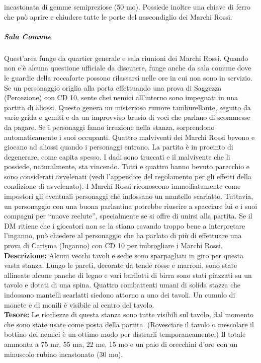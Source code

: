 \documentclass{article}
\begin{document}
        incastonata di gemme semipreziose (50 mo). Possiede inoltre
        una chiave di ferro che può aprire e chiudere tutte le porte del
        nascondiglio dei Marchi Rossi.
        \subparagraph{Sala Comune} 
        Quest'area funge da quartier generale e sala riunioni dei
        Marchi Rossi. Quando non c'è alcuna questione ufficiale
        da discutere, funge anche da sala comune dove le guardie
        della roccaforte possono rilassarsi nelle ore in cui non
        sono in servizio.
        Se un personaggio origlia alla porta effettuando una prova
        di Saggezza (Percezione) con CD 10, sente chei nemici
        all’interno sono impegnati in una partita di aliossi. Questo
        genera un misterioso rumore tamburellante, seguito da varie
        grida e gemiti e da un improvviso brusio di voci che parlano
        di scommesse da pagare. Se i personaggi fanno irruzione
        nella stanza, sorprendono automaticamente i suoi occupanti. Quattro malviventi dei Marchi Rossi bevono e giocano ad
        aliossi quando i personaggi entrano. La partita è in procinto
        di degenerare, come capita spesso. I dadi sono truccati e
        il malvivente che li possiede, naturalmente, sta vincendo.
        Tutti e quattro hanno bevuto parecchio e sono considerati
        avvelenati (vedi l’appendice del regolamento per gli effetti
        della condizione di avvelenato). I Marchi Rossi riconoscono immediatamente come
        impostori gli eventuali personaggi che indossano un mantello
        scarlatto. Tuttavia, un personaggio con una buona parlantina
        potrebbe riuscire a spacciare lui e i suoi compagni per “nuove
        reclute”, specialmente se si offre di unirsi alla partita. Se il
        DM ritiene che i giocatori non se la stiano cavando troppo
        bene a interpretare l'inganno, può chiedere al personaggio
        che ha parlato di più di effettuare una prova di Carisma
        (Inganno) con CD 10 per imbrogliare i Marchi Rossi. 
        \textbf{Descrizione:} Alcuni vecchi tavoli e sedie sono sparpagliati in giro per questa
        vasta stanza. Lungo le pareti, decorate da tende rosse e marroni,
        sono state allineate alcune panche di legno e vari barilotti di birra
        sono stati piazzati su un tavolo e dotati di una spina.
        Quattro combattenti umani di solida stazza che indossano
        mantelli scarlatti siedono attorno a uno dei tavoli. Un cumulo di
        monete e di monili è visibile al centro del tavolo.\\
        \textbf{Tesore:} Le ricchezze di questa stanza sono tutte visibili sul tavolo,
        dal momento che sono state usate come posta della partita.
        (Rovesciare il tavolo o mescolare il bottino dei nemici è
        un ottimo modo per distrarli temporaneamente.) Il totale
        ammonta a 75 mr, 55 ma, 22 me, 15 mo e un paio di orecchini
        d’oro con un minuscolo rubino incastonato (30 mo).\\
\end{document}
